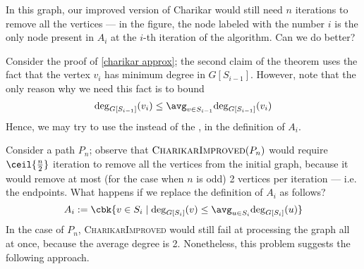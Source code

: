 \documentclass[a4paper, 12pt]{report}
\begin{document}
    \begin{figure}[H]
        \centering
    \end{figure}

    In this graph, our improved version of Charikar would still need $n$ iterations to remove all the vertices --- in the figure, the node labeled with the number $i$ is the only node present in $A_i$ at the $i$-th iteration of the algorithm. Can we do better?

    Consider the proof of \cref{charikar approx}; the second claim of the theorem uses the fact that the vertex $v_i$ has minimum degree in $G[S_{i - 1}]$. However, note that the only reason why we need this fact is to bound $$\deg_{G[S_{i - 1}]}(v_i) \le \avg_{v \in S_{i - 1}}{\deg_{G[S_{i - 1}]}(v_i)}$$ Hence, we may try to use the  instead of the , in the definition of $A_i$.

    Consider a path $P_n$; observe that $\textsc{CharikarImproved}(P_n)$ would require $\ceil{\tfrac{n}{2}}$ iteration to remove all the vertices from the initial graph, because it would remove at most (for the case when $n$ is odd) 2 vertices per iteration --- i.e. the endpoints. What happens if we replace the definition of $A_i$ as follows? $$A_i := \cbk{v \in S_i \mid \deg_{G[S_i]}(v) \le \avg_{u \in S_i}{\deg_{G[S_i]}(u)}}$$ In the case of $P_n$, \textsc{CharikarImproved} would still fail at processing the graph all at once, because the average degree is  2. Nonetheless, this problem suggests the following approach.
\end{document}
